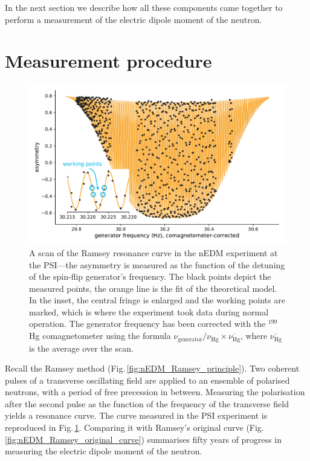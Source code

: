 In the next section we describe how all these components came together to perform a measurement of the electric dipole moment of the neutron.



\section{Measurement procedure}
\label{sec:measurement_procedure}

\begin{figure}
  \centering
  \includegraphics[width=0.8\linewidth]{gfx/nEDMatPSI/ramsey_scan.pdf}
  \caption{A scan of the Ramsey resonance curve in the nEDM experiment at the PSI---the asymmetry is measured as the function of the detuning of the spin-flip generator's frequency. The black points depict the measured points, the orange line is the fit of the theoretical model. In the inset, the central fringe is enlarged and the working points are marked, which is where the experiment took data during normal operation. The generator frequency has been corrected with the $^{199}$Hg comagnetometer using the formula $\nu_\text{generator} / \nu_\text{Hg} \times \overline{\nu_\text{Hg}}$, where $\overline{\nu_\text{Hg}}$ is the average over the scan.}
  \label{fig:ramsey_scan}
\end{figure}

Recall the Ramsey method (Fig.\,\ref{fig:nEDM_Ramsey_principle}). Two coherent pulses of a transverse oscillating field are applied to an ensemble of polarised neutrons, with a period of free precession in between. Measuring the polarisation after the second pulse as the function of the frequency of the transverse field yields a resonance curve. The curve measured in the PSI experiment is reproduced in Fig.\,\ref{fig:ramsey_scan}. Comparing it with Ramsey's original curve (Fig.\,\ref{fig:nEDM_Ramsey_original_curve}) summarises fifty years of progress in measuring the electric dipole moment of the neutron.

